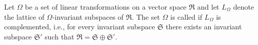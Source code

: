 Let $\Omega$ be a set of linear transformations on a vector space $\mathfrak{R}$ and let $L_{\Omega}$ denote the lattice of $\Omega$-invariant subspaces of $\mathfrak{R}$. The set $\Omega$ is called  if $L_{\Omega}$ is complemented, i.e., for every invariant subspace $\mathfrak{S}$ there exists an invariant subspace $\mathfrak{S}'$ such that $\mathfrak{R} = \mathfrak{S} \oplus \mathfrak{S}'$.
